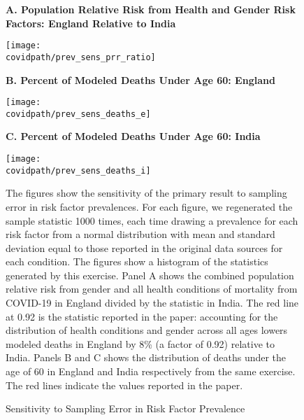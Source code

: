 \documentclass[12pt,letterpaper]{article}
\numberwithin{equation}{section}
\begin{document}
  \begin{figure}[H]
    \begin{center}
      \caption{Sensitivity to Sampling Error in Risk Factor Prevalence}
      
      \footnotesize{\textbf{A. Population Relative Risk from Health and Gender Risk
        Factors: \newline England Relative to India}}
      
      \texttt{[image: \\covidpath/prev\_sens\_prr\_ratio]}

      \newline
      
      \footnotesize{\textbf{B. Percent of Modeled Deaths Under Age 60: England}}
      
      \texttt{[image: \\covidpath/prev\_sens\_deaths\_e]}

      \newline
      
      \footnotesize{\textbf{C. Percent of Modeled Deaths Under Age 60: India}}
      
      \texttt{[image: \\covidpath/prev\_sens\_deaths\_i]}
    
    \end{center}
    
    \footnotesize{The figures show the sensitivity of the primary
      result to sampling error in risk factor prevalences. For each
      figure, we regenerated the sample statistic 1000 times, each
      time drawing a prevalence for each risk factor from a normal
      distribution with mean and standard deviation equal to those reported
      in the original data sources for each condition. The
      figures show a histogram of the statistics generated by this
      exercise. Panel A shows the combined population relative risk
      from gender and all health conditions of mortality from COVID-19
      in England divided by the statistic in India. The red line at
      0.92 is the statistic reported in the paper: accounting for the
      distribution of health conditions and gender across all ages
      lowers modeled deaths in England by 8\% (a factor of 0.92)
      relative to India. Panels B and C shows the distribution of
      deaths under the age of 60 in England and India respectively
      from the same exercise. The red lines indicate the values
      reported in the paper.}
  \end{figure}

  
\end{document}
